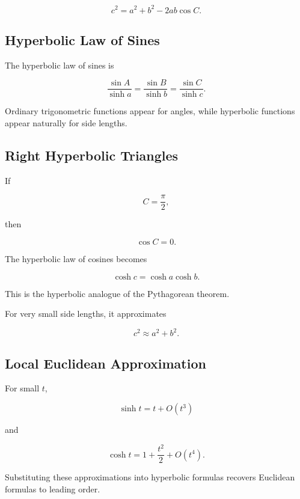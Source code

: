 \[
c^2=a^2+b^2-2ab\cos C.
\]

\subsection{Hyperbolic Law of Sines}
\label{subsec:hyperbolic-law-sines}

The hyperbolic law of sines is

\[
\boxed{
\frac{\sin A}{\sinh a}
=
\frac{\sin B}{\sinh b}
=
\frac{\sin C}{\sinh c}.
}
\]

Ordinary trigonometric functions appear for angles, while hyperbolic
functions appear naturally for side lengths.

\subsection{Right Hyperbolic Triangles}
\label{subsec:right-hyperbolic-triangles}

If

\[
C=\frac{\pi}{2},
\]

then

\[
\cos C=0.
\]

The hyperbolic law of cosines becomes

\[
\boxed{
\cosh c
=
\cosh a\cosh b.
}
\]

This is the hyperbolic analogue of the Pythagorean theorem.

For very small side lengths, it approximates

\[
c^2\approx a^2+b^2.
\]

\subsection{Local Euclidean Approximation}
\label{subsec:local-euclidean-approximation}

For small \(t\),

\[
\sinh t
=
t+O(t^3)
\]

and

\[
\cosh t
=
1+\frac{t^2}{2}+O(t^4).
\]

Substituting these approximations into hyperbolic formulas recovers
Euclidean formulas to leading order.

